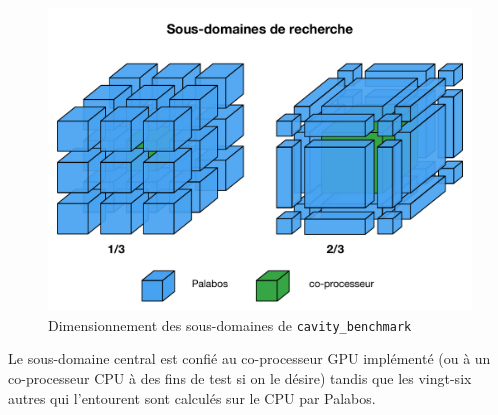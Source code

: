 \begin{figure}[H]
	\centering
	\includegraphics[scale=0.65, fbox]{images/decoupage_sous_domaine_cavity_benchmark.pdf}
	\caption{Dimensionnement des sous-domaines de \texttt{cavity\_benchmark}}
	\label{fig:decoupage_sous_domaine_cavity_benchmark}
\end{figure}

Le sous-domaine central est confié au co-processeur \acs{GPU} implémenté (ou à un co-processeur \acs{CPU} à des fins de test si on le désire) tandis que les vingt-six autres qui l'entourent sont calculés sur le \acs{CPU} par Palabos.

